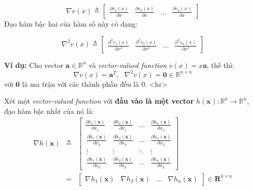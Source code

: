 \documentclass[12pt]{article}
\begin{document}
\begin{equation} 
\label{eqn:grvectorvalued}
\nabla v(x) \triangleq  
\left[ 
\begin{matrix} 
    \frac{\partial v_1(x)}{\partial x} & \frac{\partial v_2(x)}{\partial x} & \dots & \frac{\partial v_n(x)}{\partial x} 
\end{matrix} 
\right]
\end{equation} 
Đạo hàm bậc hai của hàm số này có dạng: 
 
\begin{equation} 
	\label{eqn:hessianvectorvalued}
	\nabla^2 v(x) \triangleq  
	\left[ 
	\begin{matrix} 
	    \frac{\partial^2 v_1(x)}{\partial x^2} & \frac{\partial^2 v_2(x)}{\partial x^2} & \dots & \frac{\partial^2 v_n(x)}{\partial x^2} 
	\end{matrix} 
	\right] 
\end{equation} 
 
\textbf{Ví dụ:} Cho vector $\mathbf{a} \in \mathbb{R}^n$ và \textit{vector-valued function} $v(x) = x\mathbf{a}$, thế thì: 
\begin{equation} 
\nabla v(x) = \mathbf{a}^T, ~~~ \nabla^2 v(x) = \mathbf{0} \in \mathbb{R}^{n\times n} 
\end{equation} 
với $\mathbf{0}$ là ma trận với các thành phần đều là 0.  
<hr> 
 
Xét một \textit{vector-valued function} với \textbf{đầu vào là một vector} $h(\mathbf{x}):\mathbb{R}^k \rightarrow \mathbb{R}^n$, đạo hàm bậc nhất của nó là: 
\begin{eqnarray} 
\label{eqn:gdvectorvector}
\nabla h(\mathbf{x}) &\triangleq & 
\left[ 
\begin{matrix} 
    \frac{\partial h_1(\mathbf{x})}{\partial x_1} & \frac{\partial h_2(\mathbf{x})}{\partial x_1} & \dots & \frac{\partial h_n(\mathbf{x})}{\partial x_1} \\\  
    \frac{\partial h_1(\mathbf{x})}{\partial x_2} & \frac{\partial h_2(\mathbf{x})}{\partial x_2} & \dots & \frac{\partial h_n(\mathbf{x})}{\partial x_2} \\\  
    \vdots & \vdots & \ddots & \vdots \\\ 
    \frac{\partial h_1(\mathbf{x})}{\partial x_k} & \frac{\partial h_2(\mathbf{x})}{\partial x_k} & \dots & \frac{\partial h_n(\mathbf{x})}{\partial x_k} 
\end{matrix} 
\right]\\
\label{eqn:gdvectorvector_short}
& = &  
\left[ 
\begin{matrix} 
    \nabla h_1(\mathbf{x}) & \nabla h_2(\mathbf{x}) & \dots & \nabla h_n(\mathbf{x}) 
\end{matrix} 
\right] \in \mathbf{R}^{k\times n} 
\end{eqnarray} 
 
\end{document}
